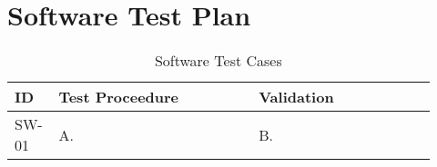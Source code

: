 

\setcounter{section}{4}
\section{Software Test Plan}
\bigskip


\bigskip
\bgroup
\def\arraystretch{1.25}
\begin{table}[h!]
    \centering
    \begin{tabular}{|p{0.07\linewidth}|p{0.45\linewidth}|p{0.40\linewidth}|} 
    \hline
    ID & Test Proceedure & Validation\\ 
    
    \hline
    SW-01
    & A.  
    & B. \\ 
    \hline    





    \hline
    \end{tabular}
    \caption{Software Test Cases}
\end{table}